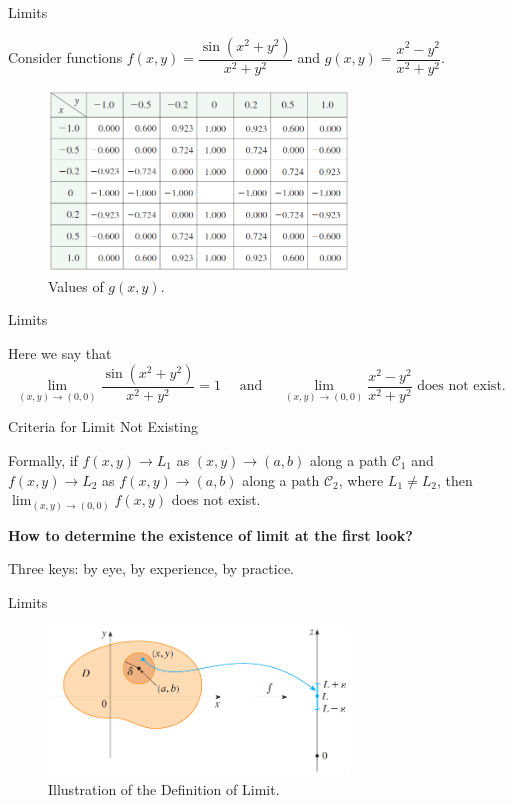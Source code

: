 \documentclass{beamer}
\begin{document}
    \begin{frame}[t]{Limits}
        \par Consider functions $f(x,y) = \dfrac{\sin(x^2+y^2)}{x^2+y^2}$ and $g(x,y) = \dfrac{x^2-y^2}{x^2+y^2}$.
        \begin{figure}
            \centering 
            \includegraphics[width = 8cm]{f6}
            \caption{Values of $g(x,y)$.}
        \end{figure}
    \end{frame}

    \begin{frame}[t]{Limits}
        \par Here we say that 
        \begin{equation*}
            \lim _{(x, y) \rightarrow(0,0)} \frac{\sin \left(x^{2}+y^{2}\right)}{x^{2}+y^{2}}=1 \quad \text { and } \quad \lim _{(x, y) \rightarrow(0,0)} \frac{x^{2}-y^{2}}{x^{2}+y^{2}} \text{ does not exist.}
        \end{equation*}


        \begin{block}{Criteria for Limit Not Existing}
            \par Formally, if $f(x,y) \to L_1$ as $(x,y) \to (a,b)$ along a path $\mathcal{C}_1$ and $f(x,y) \to L_2$ as $f(x,y) \to (a,b)$ along a path $\mathcal{C}_2$, where $L_1 \neq L_2$, then $\lim_{(x, y) \rightarrow(0,0)} f(x,y)$ does not exist.
        \end{block}


        \par \textbf{How to determine the existence of limit at the first look?}
        \par Three keys: by eye, by experience, by practice.  
    \end{frame}

    \begin{frame}[t]{Limits}
        \begin{figure}
            \centering 
            \includegraphics[width = 8cm]{f7}
            \caption{Illustration of the Definition of Limit.}
        \end{figure}
    \end{frame}
\end{document}
